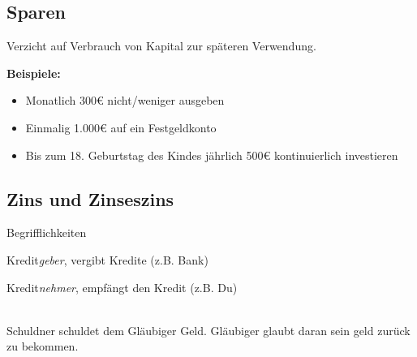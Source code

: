 \documentclass{beamer}
\begin{document}
		\subsection{Sparen}
		
			\begin{frame}
				\begin{definition}
					Verzicht auf Verbrauch von Kapital zur späteren Verwendung.
				\end{definition}\hfill
				
				\textbf{Beispiele:}
				\begin{itemize}
					\item Monatlich 300€ nicht/weniger ausgeben
					\item Einmalig 1.000€ auf ein Festgeldkonto
					\item Bis zum 18. Geburtstag des Kindes jährlich 500€ kontinuierlich investieren
				\end{itemize}
			\end{frame}
		
		\subsection{Zins und Zinseszins}
		
			\begin{frame}{Begrifflichkeiten}
				\begin{description}[labelwidth=0cm]
					\item[Gläubiger] Kredit\textit{geber}, vergibt Kredite (z.B. Bank)\pause
					\item[Schuldner] Kredit\textit{nehmer}, empfängt den Kredit (z.B. Du)
				\end{description}
				\hfill\\\pause
				Schuldner schuldet dem Gläubiger Geld.\n
				Gläubiger glaubt daran sein geld zurück zu bekommen.
			\end{frame}
		
\end{document}
